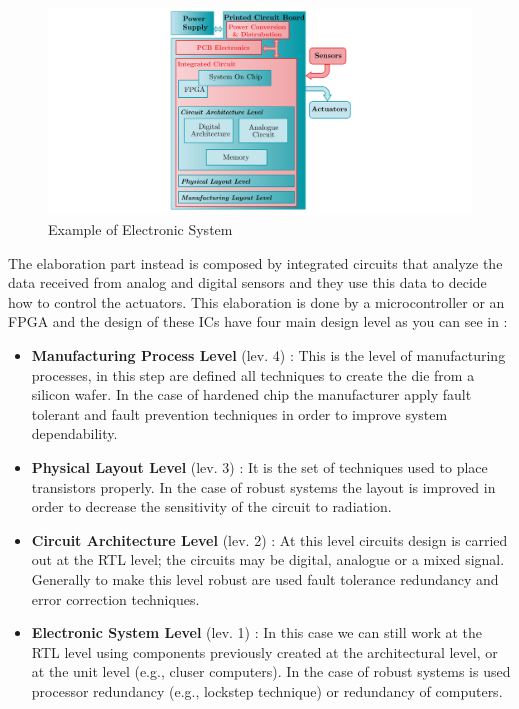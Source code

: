 {{{			\begin{figure}[H]
				\centering
				\includegraphics[scale=0.26,center]{./images/ElectronicSystemParts.png}
				\caption{Example of Electronic System}
				\label{fig:ElectronicSystemParts}
			\end{figure} 
			
			The elaboration part instead is composed by integrated circuits that analyze the data received from analog and digital sensors and they use this data to decide how to control the actuators. This elaboration is done by a microcontroller or an FPGA and the design of these ICs have four main design level  as you can see in :
			\begin{itemize}
				\item \textbf{Manufacturing Process Level } (lev. 4) : This is the level of manufacturing processes, in this step are defined all techniques to create the die from a silicon wafer. In the case of hardened chip the manufacturer apply fault tolerant and fault prevention techniques in order to improve system dependability. 
				\item \textbf{Physical Layout Level} (lev. 3) : It is the set of techniques used to place transistors properly. In the case of robust systems the layout is improved in order to decrease the sensitivity of the circuit to radiation.
				\item \textbf{Circuit Architecture Level } (lev. 2) : At this level circuits design is carried out at the RTL level; the circuits may be digital, analogue or a mixed signal. Generally to make this level robust are used fault tolerance redundancy and error correction techniques.   
				\item \textbf{Electronic System Level } (lev. 1) : In this case we can still work at the RTL level using components previously created at the architectural level, or at the unit level (e.g., cluser computers). In the case of robust systems is used processor redundancy (e.g., lockstep technique) or redundancy of computers.
			\end{itemize}  
		
}}}
